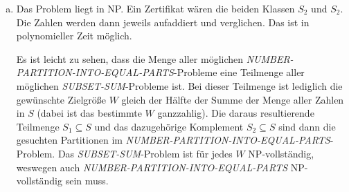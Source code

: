 \documentclass[12pt,a4paper]{article}
\begin{document}
\begin{enumerate}[a)]
	\item Das Problem liegt in NP. Ein Zertifikat wären die beiden Klassen $S_2$ und $S_2$. Die Zahlen werden dann jeweils aufaddiert und verglichen. Das ist in polynomieller Zeit möglich.
		
	Es ist leicht zu sehen, dass die Menge aller möglichen \textit{NUMBER-PARTITION-INTO-EQUAL-PARTS}-Probleme eine Teilmenge aller möglichen \textit{SUBSET-SUM}-Probleme ist. Bei dieser Teilmenge ist lediglich die gewünschte Zielgröße $W$ gleich der Hälfte der Summe der Menge aller Zahlen in $S$ (dabei ist das bestimmte $W$ ganzzahlig). Die daraus resultierende Teilmenge $S_1 \subseteq S$ und das dazugehörige Komplement $S_2 \subseteq S$ sind dann die gesuchten Partitionen im \textit{NUMBER-PARTITION-INTO-EQUAL-PARTS}-Problem. Das \textit{SUBSET-SUM}-Problem ist für jedes $W$ NP-vollständig, weswegen auch \textit{NUMBER-PARTITION-INTO-EQUAL-PARTS} NP-vollständig sein muss.

\end{enumerate}
\end{document}
